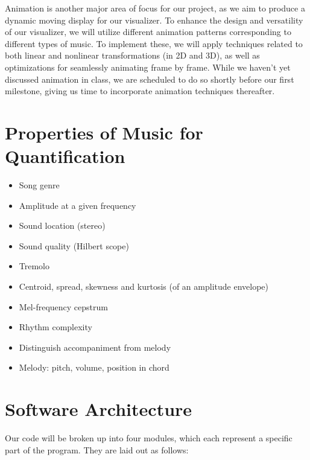\documentclass{article}
\begin{document}
Animation is another major area of focus for our project, as we aim to produce a dynamic moving display for our visualizer. To enhance the design and versatility of our visualizer, we will utilize different animation patterns corresponding to different types of music. To implement these, we will apply techniques related to both linear and nonlinear transformations (in 2D and 3D), as well as optimizations for seamlessly animating frame by frame. While we haven't yet discussed animation in class, we are scheduled to do so shortly before our first milestone, giving us time to incorporate animation techniques thereafter.

\section{Properties of Music for Quantification}

\begin{itemize}
	\item Song genre
	\item Amplitude at a given frequency
	\item Sound location (stereo)
	\item Sound quality (Hilbert scope)
	\item Tremolo
	\item Centroid, spread, skewness and kurtosis (of an amplitude envelope)
	\item Mel-frequency cepstrum
	\item Rhythm complexity
	\item Distinguish accompaniment from melody
	\item Melody: pitch, volume, position in chord
\end{itemize}

\section{Software Architecture}

Our code will be broken up into four modules, which each represent a specific part of the program. They are laid out as follows: \\
\end{document}
